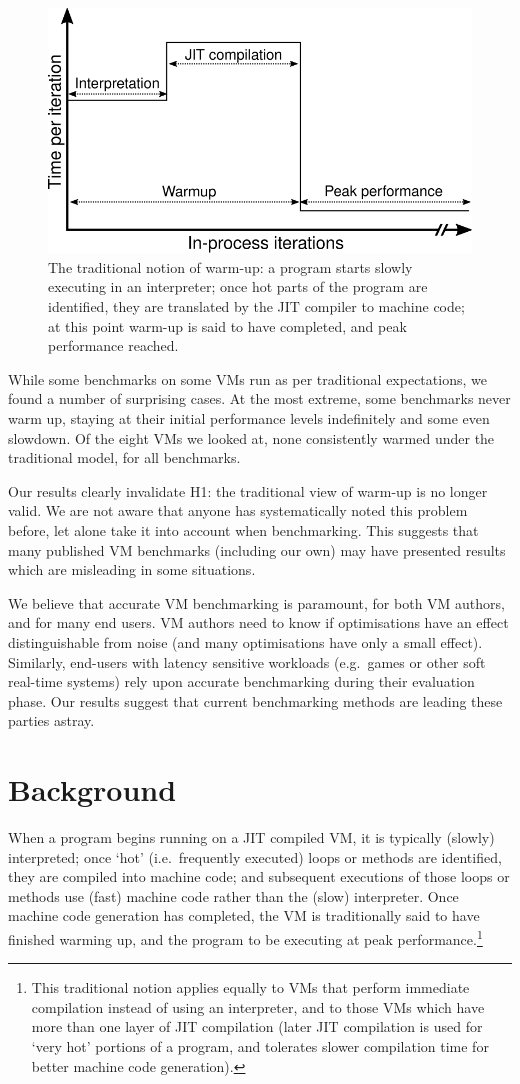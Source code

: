 \documentclass[preprint]{sigplanconf}
\newcommand{\hypone}{H1\xspace}
\begin{document}
\begin{figure}[t]
\centering
\includegraphics[width=.5\textwidth]{img/picturebook_warmup}
\caption{The traditional notion of warm-up: a program starts slowly executing in
an interpreter; once hot parts of the program are identified, they are
translated by the JIT compiler to machine code; at this point warm-up
is said to have completed, and peak performance reached.}
\label{fig:trad}
\end{figure}

While some benchmarks on some VMs run as per
traditional expectations, we found a number of surprising cases. At
the most extreme, some benchmarks never warm up, staying at their initial performance
levels indefinitely and some even slowdown. Of the eight
VMs we looked at, none consistently warmed under the traditional model, for
all benchmarks.

Our results clearly invalidate \hypone: the traditional view of warm-up is no longer
valid. We are not aware that anyone has systematically noted this
problem before, let alone take it into account when benchmarking. This suggests
that many published VM benchmarks (including our own) may have presented
results which are misleading in some situations.

We believe that accurate VM benchmarking is paramount, for both VM authors, and
for many end users. VM authors need to know if optimisations have an effect
distinguishable from noise (and many optimisations have only a small effect).
Similarly, end-users with latency sensitive workloads (e.g.~games or other soft
real-time systems) rely upon accurate benchmarking during their evaluation
phase. Our results suggest that current benchmarking methods are leading
these parties astray.

\section{Background}
\label{sec:warmup}

When a program begins running on a JIT compiled VM, it is typically (slowly)
interpreted; once `hot' (i.e.~frequently executed) loops or methods are
identified, they are compiled into machine code; and subsequent
executions of those loops or methods use (fast) machine code rather than the
(slow) interpreter. Once machine code generation has completed, the VM is
traditionally said to have finished warming up, and the program to be executing
at peak performance.\footnote{This traditional notion applies equally to VMs
that perform immediate compilation instead of using an interpreter, and to
those VMs which have more than one layer of JIT compilation (later JIT
compilation is used for `very hot' portions of a program, and tolerates slower
compilation time for better machine code generation).}
\end{document}

